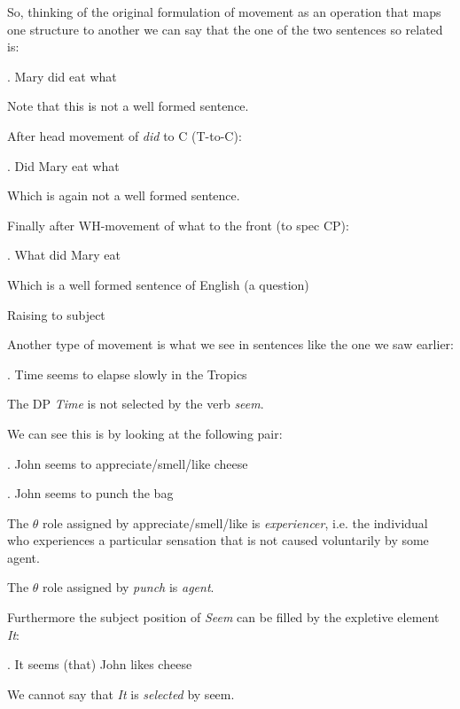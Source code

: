 \begin{frame}
  So, thinking of the original formulation of movement as an operation that maps one structure to another we can say that the one of the two sentences so related is:

\ex.
Mary did eat what

Note that this is not a well formed sentence.


\end{frame}


\begin{frame}
  After head movement of \textit{did} to C (T-to-C):

\ex.
Did Mary eat what


Which is again not a well formed sentence.


\end{frame}

\begin{frame}
  Finally after WH-movement of what to the front (to spec CP):

\ex.
What did Mary eat


Which is a well formed sentence of English (a question)

\end{frame}

\begin{frame}
  {Raising to subject}

Another type of movement is what we see in sentences like the one we saw earlier:

\ex.
Time seems to elapse slowly in the Tropics

The DP \textit{Time} is not selected by the verb \textit{seem}.


\end{frame}


\begin{frame}
  We can see this is by looking at the following pair:

\ex.
John seems to appreciate/smell/like cheese


\ex.
John seems to punch the bag


The $\theta$ role assigned by appreciate/smell/like is \textit{experiencer}, i.e. the individual who experiences a particular sensation that is not caused voluntarily by some agent.

The $\theta$ role assigned by \textit{punch} is \textit{agent}.


\end{frame}

\begin{frame}
  Furthermore the subject position of \textit{Seem} can be filled by the expletive element \textit{It}:

\ex.
It seems (that) John likes cheese


We cannot say that \textit{It} is \textit{selected} by seem.

\end{frame}


